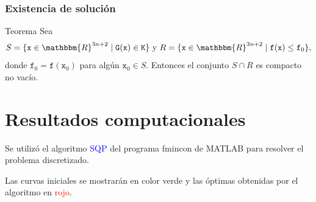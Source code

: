 \documentclass[10pt,mathserif]{beamer}
\newcommand{\R}{\mathbbm{R}}
\begin{document}
\begin{frame}

\frametitle{Existencia de solución}
\begin{block}{Teorema}
Sea 
$$S=\{\texttt{x}\in\R^{3n+2}\mid \texttt{G}(\texttt{x})\in \texttt{K}\}\mbox{ y }R=\{\texttt{x}\in\R^{3n+2}\mid \texttt{f}(\texttt{x})\leq \texttt{f}_0\},$$
donde $\texttt{f}_0=\texttt{f}(\texttt{x}_0)$ para algún $\texttt{x}_0\in S$. Entonces el conjunto $S\cap R$ es compacto no vacío.
\end{block}



\end{frame}
\section{Resultados computacionales}


\begin{frame}
\begin{block}{}
Se utilizó el algoritmo \textcolor{blue}{SQP} del programa \textcolor{mymauve}{fmincon} de MATLAB para resolver el problema discretizado.

Las curvas iniciales se mostrarán en color \textcolor{mygreen}{verde} y las óptimas obtenidas por el algoritmo en \textcolor{red}{rojo}.
\end{block}

\end{frame}
\end{document}
